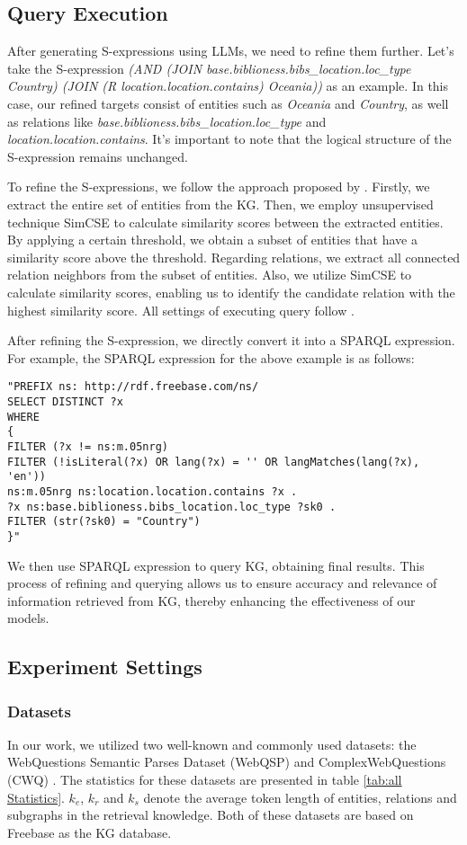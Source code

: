 \subsection{Query Execution}
After generating S-expressions using LLMs, we need to refine them further. Let's take the S-expression \textit{(AND (JOIN base.biblioness.bibs\_location.loc\_type Country) (JOIN (R location.location.contains) Oceania))} as an example. In this case, our refined targets consist of entities such as \textit{Oceania} and \textit{Country}, as well as relations like \textit{base.biblioness.bibs\_location.loc\_type} and \textit{location.location.contains}. It's important to note that the logical structure of the S-expression remains unchanged.

To refine the S-expressions, we follow the approach proposed by \citet{chatkbqa}. Firstly, we extract the entire set of entities from the KG. Then, we employ unsupervised technique SimCSE \cite{gao2021simcse} to calculate similarity scores between the extracted entities. By applying a certain threshold, we obtain a subset of entities that have a similarity score above the threshold.
Regarding relations, we extract all connected relation neighbors from the subset of entities. Also, we utilize SimCSE to calculate similarity scores, enabling us to identify the candidate relation with the highest similarity score. All settings of executing query follow \citet{chatkbqa}.

After refining the S-expression, we directly convert it into a SPARQL expression. For example, the SPARQL expression for the above example is as follows:
\lstset{language=C}
\begin{lstlisting}
"PREFIX ns: http://rdf.freebase.com/ns/
SELECT DISTINCT ?x
WHERE 
{
FILTER (?x != ns:m.05nrg)
FILTER (!isLiteral(?x) OR lang(?x) = '' OR langMatches(lang(?x), 'en'))
ns:m.05nrg ns:location.location.contains ?x .
?x ns:base.biblioness.bibs_location.loc_type ?sk0 .
FILTER (str(?sk0) = "Country")
}"
\end{lstlisting}
We then use SPARQL expression to query KG, obtaining final results. This process of refining and querying allows us to ensure accuracy and relevance of information retrieved from KG, thereby enhancing the effectiveness of our models.


\subsection{Experiment Settings}
\subsubsection{Datasets}
In our work, we utilized two well-known and commonly used datasets: the WebQuestions Semantic Parses Dataset (WebQSP) \cite{webqsp} and ComplexWebQuestions (CWQ) \cite{CWQ}. The statistics for these datasets are presented in table \ref{tab:all Statistics}. $k_e$, $k_r$ and $k_s$ denote the average token length of entities, relations and subgraphs in the retrieval knowledge.  Both of these datasets are based on Freebase \cite{bollacker2008freebase} as the KG database.

